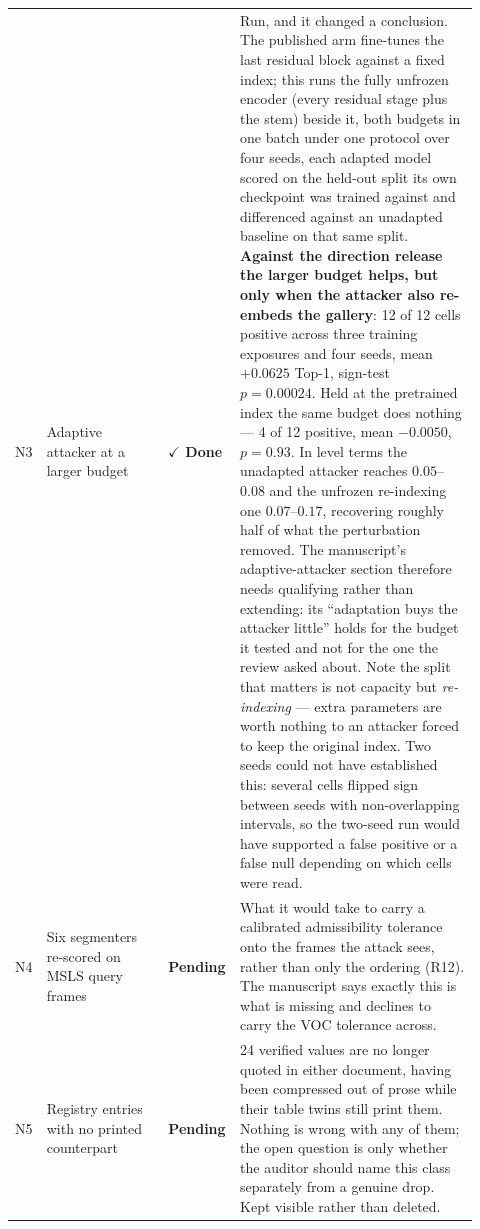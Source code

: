 \documentclass[11pt]{article}
\newcommand{\done}{\textcolor{DoneGreen}{\textbf{$\checkmark$ Done}}}
\newcommand{\pending}{\textcolor{PendRed}{\textbf{Pending}}}
\begin{document}
\begin{longtable}{@{}p{0.05\linewidth}p{0.26\linewidth}p{0.10\linewidth}p{0.51\linewidth}@{}}
N3 & Adaptive attacker at a larger budget & \done & Run, and it changed a
conclusion. The published arm fine-tunes the last residual block against a
fixed index; this runs the fully unfrozen encoder (every residual stage plus
the stem) beside it, both budgets in one batch under one protocol over four
seeds, each adapted model scored on the held-out split its own checkpoint was
trained against and differenced against an unadapted baseline on that same
split. \textbf{Against the direction release the larger budget helps, but only
when the attacker also re-embeds the gallery}: 12 of 12 cells positive across
three training exposures and four seeds, mean $+0.0625$ Top-1, sign-test
$p=0.00024$. Held at the pretrained index the same budget does nothing --- 4
of 12 positive, mean $-0.0050$, $p=0.93$. In level terms the unadapted
attacker reaches $0.05$--$0.08$ and the unfrozen re-indexing one $0.07$--$0.17$,
recovering roughly half of what the perturbation removed. The manuscript's
adaptive-attacker section therefore needs qualifying rather than extending:
its ``adaptation buys the attacker little'' holds for the budget it tested and
not for the one the review asked about. Note the split that matters is not
capacity but \emph{re-indexing} --- extra parameters are worth nothing to an
attacker forced to keep the original index. Two seeds could not have
established this: several cells flipped sign between seeds with non-overlapping
intervals, so the two-seed run would have supported a false positive or a false
null depending on which cells were read. \\
\addlinespace

N4 & Six segmenters re-scored on MSLS query frames & \pending & What it would
take to carry a calibrated admissibility tolerance onto the frames the attack
sees, rather than only the ordering (R12). The manuscript says exactly this is
what is missing and declines to carry the VOC tolerance across. \\
\addlinespace

N5 & Registry entries with no printed counterpart & \pending & 24 verified
values are no longer quoted in either document, having been compressed out of
prose while their table twins still print them. Nothing is wrong with any of
them; the open question is only whether the auditor should name this class
separately from a genuine drop. Kept visible rather than deleted. \\

\bottomrule
\end{longtable}
\end{document}
